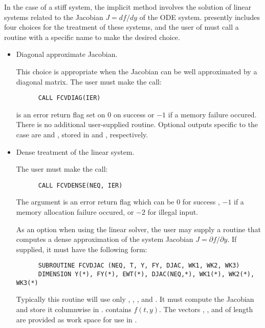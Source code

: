 \begin{Steps}
  In the case of a stiff system, the implicit  method involves the solution
  of linear systems related to the Jacobian $J = df/dy$ of the ODE system.
  {\cvode} presently includes four choices for the treatment of these systems,
  and the user of {\fcvode} must call a routine with a specific name to make the
  desired choice.

  \begin{itemize}

  \item {\s} Diagonal approximate Jacobian.

    This choice is appropriate when the Jacobian can be well approximated by
    a diagonal matrix.  The user must make the call:
\begin{verbatim}
      CALL FCVDIAG(IER)
\end{verbatim}
     is an error return flag set on $0$ on success or $-1$ if a memory 
    failure occured.
    There is no additional user-supplied routine. Optional outputs specific
    to the {\diag} case are  and , stored in  
    and , respectively.

  \item {\s} Dense treatment of the linear system.

    The user must make the call:
\begin{verbatim}
      CALL FCVDENSE(NEQ, IER)
\end{verbatim}
    The argument  is an error return flag which can be $0$ 
    for success , $-1$ if a memory allocation failure occured, or $-2$ for illegal input. 
    
    As an option when using the {\dense} linear solver, the user may supply a
    routine that computes a dense approximation of the system Jacobian 
    $J = \partial f / \partial y$. If supplied, it must have the following form:
\begin{verbatim}
      SUBROUTINE FCVDJAC (NEQ, T, Y, FY, DJAC, WK1, WK2, WK3)
      DIMENSION Y(*), FY(*), EWT(*), DJAC(NEQ,*), WK1(*), WK2(*), WK3(*)
\end{verbatim}
    Typically this routine will use only , , , and . 
    It must compute the Jacobian and store it columnwise in .
     contains $f(t,y)$. The vectors , , and 
    of length  are provided as work space for use in .


\end{itemize}
\end{Steps}
